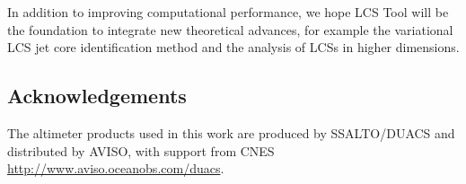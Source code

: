 \documentclass{article}
\begin{document}

In addition to improving computational performance, we hope LCS Tool will be the foundation to integrate new theoretical advances, for example the variational LCS jet core identification method\parencite{farazmand13:_shearless} and the 
analysis of LCSs in higher dimensions\parencite{blazevski:_hyper_ellip_trans_barrier_three}.

\subsection*{Acknowledgements}

The altimeter products used in this work are produced by SSALTO/DUACS and distributed by AVISO, with support from CNES \url{http://www.aviso.oceanobs.com/duacs}.

\printbibliography
\end{document}
